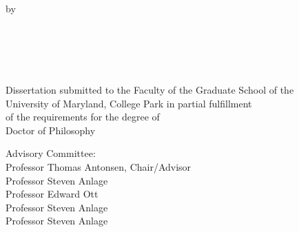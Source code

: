 
\clearpage{}
{}

\thispagestyle{empty}
\hbox{\ }
\vspace{1in}
\renewcommand{\baselinestretch}{1}
\small\normalsize
\begin{center}

\large{{\dissertationtitle}}\\
\ \\
\ \\
\large{by} \\
\ \\%
\large{\myfullname}
\ \\
\ \\
\ \\
\ \\
\normalsize
Dissertation submitted to the Faculty of the Graduate School of the \\
University of Maryland, College Park in partial fulfillment \\
of the requirements for the degree of \\
Doctor of Philosophy \\
\gradyear
\end{center}

\vspace{7.5em}

\noindent Advisory Committee: \\
Professor Thomas Antonsen, Chair/Advisor \\
Professor Steven Anlage\\
Professor Edward Ott\\
Professor Steven Anlage\\
Professor Steven Anlage\\


